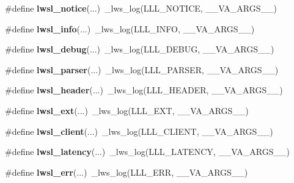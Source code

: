 \begin{DoxyCompactItemize}
\#define {\bfseries lwsl\+\_\+notice}(...)~\+\_\+lws\+\_\+log(L\+L\+L\+\_\+\+N\+O\+T\+I\+CE, \+\_\+\+\_\+\+V\+A\+\_\+\+A\+R\+G\+S\+\_\+\+\_\+)
\item 
\mbox{\label{group__log_gaf13957a4d9fb47c070b9320303c32502}} 
\#define {\bfseries lwsl\+\_\+info}(...)~\+\_\+lws\+\_\+log(L\+L\+L\+\_\+\+I\+N\+FO, \+\_\+\+\_\+\+V\+A\+\_\+\+A\+R\+G\+S\+\_\+\+\_\+)
\item 
\mbox{\label{group__log_ga74a1a3d4d96b146a0ac45faab0028ade}} 
\#define {\bfseries lwsl\+\_\+debug}(...)~\+\_\+lws\+\_\+log(L\+L\+L\+\_\+\+D\+E\+B\+UG, \+\_\+\+\_\+\+V\+A\+\_\+\+A\+R\+G\+S\+\_\+\+\_\+)
\item 
\mbox{\label{group__log_gaee051a14945bec746ed3b527f384dc72}} 
\#define {\bfseries lwsl\+\_\+parser}(...)~\+\_\+lws\+\_\+log(L\+L\+L\+\_\+\+P\+A\+R\+S\+ER, \+\_\+\+\_\+\+V\+A\+\_\+\+A\+R\+G\+S\+\_\+\+\_\+)
\item 
\mbox{\label{group__log_gaab72aa186eff075fb3d229cb99a35434}} 
\#define {\bfseries lwsl\+\_\+header}(...)~\+\_\+lws\+\_\+log(L\+L\+L\+\_\+\+H\+E\+A\+D\+ER, \+\_\+\+\_\+\+V\+A\+\_\+\+A\+R\+G\+S\+\_\+\+\_\+)
\item 
\mbox{\label{group__log_ga8e0877b452d80bc154793ad81bfce742}} 
\#define {\bfseries lwsl\+\_\+ext}(...)~\+\_\+lws\+\_\+log(L\+L\+L\+\_\+\+E\+XT, \+\_\+\+\_\+\+V\+A\+\_\+\+A\+R\+G\+S\+\_\+\+\_\+)
\item 
\mbox{\label{group__log_ga181ea1ed9ba604e493ce092850d9da90}} 
\#define {\bfseries lwsl\+\_\+client}(...)~\+\_\+lws\+\_\+log(L\+L\+L\+\_\+\+C\+L\+I\+E\+NT, \+\_\+\+\_\+\+V\+A\+\_\+\+A\+R\+G\+S\+\_\+\+\_\+)
\item 
\mbox{\label{group__log_gab5842ee4ec5f763d057869e083ff1cb0}} 
\#define {\bfseries lwsl\+\_\+latency}(...)~\+\_\+lws\+\_\+log(L\+L\+L\+\_\+\+L\+A\+T\+E\+N\+CY, \+\_\+\+\_\+\+V\+A\+\_\+\+A\+R\+G\+S\+\_\+\+\_\+)
\item 
\mbox{\label{group__log_gad44c15d00076052a398244035a7dbb56}} 
\#define {\bfseries lwsl\+\_\+err}(...)~\+\_\+lws\+\_\+log(L\+L\+L\+\_\+\+E\+RR, \+\_\+\+\_\+\+V\+A\+\_\+\+A\+R\+G\+S\+\_\+\+\_\+)
\item 

\end{DoxyCompactItemize}
